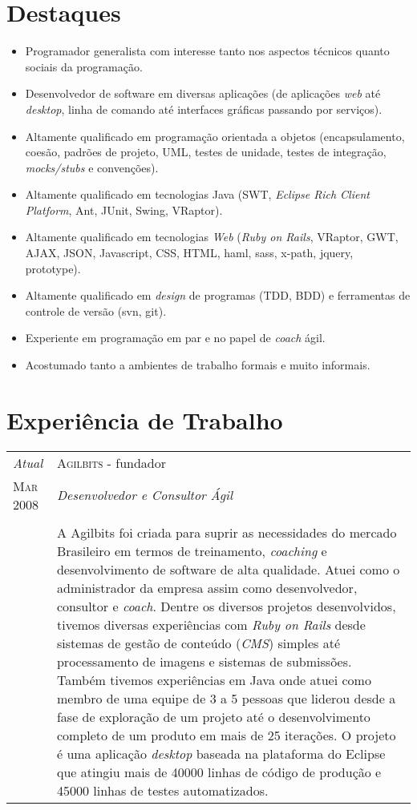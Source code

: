 \documentclass[letter,10pt]{article}
\begin{document}
\section{Destaques}

\begin{itemize}
\item Programador generalista com interesse tanto nos aspectos
  técnicos quanto sociais da programação.
\item Desenvolvedor de software em diversas aplicações (de aplicações
  \textit{web} até \textit{desktop}, linha de comando até interfaces
  gráficas passando por serviços).
\item Altamente qualificado em programação orientada a objetos
  (encapsulamento, coesão, padrões de projeto, UML, testes de unidade,
  testes de integração, \textit{mocks/stubs} e convenções).
\item Altamente qualificado em tecnologias Java (SWT, \textit{Eclipse
    Rich Client Platform}, Ant, JUnit, Swing, VRaptor).
\item Altamente qualificado em tecnologias \textit{Web} (\textit{Ruby
    on Rails}, VRaptor, GWT, AJAX, JSON, Javascript, CSS, HTML, haml,
  sass, x-path, jquery, prototype).
\item Altamente qualificado em \textit{design} de programas (TDD, BDD)
  e ferramentas de controle de versão (svn, git).
\item Experiente em programação em par e no papel de \textit{coach}
  ágil.
\item Acostumado tanto a ambientes de trabalho formais e muito
  informais.
\end{itemize}

\section{Experiência de Trabalho}

\begin{tabular}{p{2.5cm}|p{13.5cm}}
  \emph{Atual} & \textsc{Agilbits} - fundador\\
  \textsc{Mar 2008}& \emph{Desenvolvedor e Consultor Ágil}\\
  &\\
  &A Agilbits foi criada para suprir as necessidades do mercado
  Brasileiro em termos de treinamento, \textit{coaching} e
  desenvolvimento de software de alta qualidade. Atuei como o
  administrador da empresa assim como desenvolvedor, consultor e
  \textit{coach}.
  Dentre os diversos projetos desenvolvidos, tivemos diversas
  experiências com \textit{Ruby on Rails} desde sistemas de gestão de
  conteúdo (\textit{CMS}) simples até processamento de imagens e
  sistemas de submissões.
  Também tivemos experiências em Java onde atuei como membro de uma
  equipe de 3 a 5 pessoas que liderou desde a fase de exploração de
  um projeto até o desenvolvimento completo de um produto em mais de
  25 iterações. O projeto é uma aplicação \textit{desktop} baseada na
  plataforma do Eclipse que atingiu mais de 40000 linhas de código de
  produção e 45000 linhas de testes automatizados.
\end{tabular}
\end{document}
